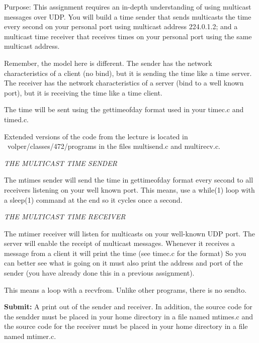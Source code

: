 

\parindent 0pt

Purpose: This assignment requires an in-depth understanding of
using multicast messages over UDP.
You will build a time sender that sends multicasts the time
every  second
on your personal port using multicast address {\ltt{}224.0.1.2};
and a multicast time receiver
that receives times on your personal port using the same multicast
address.

Remember, the model here is different. 
The sender has the network
characteristics of a client (no bind), but it is sending
the time like a time server.
The receiver has the network characteristics of a server (bind
to a well known port), but it is receiving the time like
a time client.

The time will be sent using the {\ltt{}gettimeofday} format
used in your {\ltt{}timec.c} and {\ltt{}timed.c}.

Extended versions of the code from the lecture is located
in {\ltt{}~volper/classes/472/programs} in the files
{\ltt{}multisend.c} and {\ltt{}multirecv.c}.

{\it THE MULTICAST TIME SENDER}

The {\ltt{}mtimes} sender will send the time in {\ltt{}gettimeofday} format
every second to all receivers listening on your well known port. 
This means, use a {\ltt{}while(1)} loop with a {\ltt{}sleep(1)}
command at the end so it cycles once a second.

{\it THE MULTICAST TIME RECEIVER}

The {\ltt{}mtimer} receiver will listen for multicasts
on your well-known UDP port.
The server will enable the receipt of multicast messages.
Whenever it receives a message from a client it will
print the time (see {\ltt{}timec.c} for the format)
So you can better see what is going on
it must also print the address and port of the sender
(you have already done this in a previous assignment).

This means a loop with a {\ltt{}recvfrom}.
Unlike other programs, there is no {\ltt{}sendto}.

{\bf Submit:}
A print out of the sender and receiver.
In addition,
the source code for the sendder must be placed in your home directory
in a file named {\ltt{}mtimes.c} and
the source code for the receiver must be placed in your home directory
in a file named {\ltt{}mtimer.c}.

